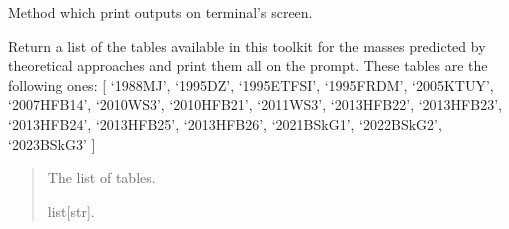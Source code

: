 \documentclass[letterpaper,10pt,english]{sphinxmanual}
\begin{document}
\begin{fulllineitems}
\begin{fulllineitems}
\end{fulllineitems}


\begin{fulllineitems}
\label{\detokenize{source/api/setup_nuc_be_theo:nucleardatapy.setup_nuc_be_theo.SetupNucBETheo.print_outputs}}
\pysigstartsignatures
\pysiglinewithargsret
{}
{}
{}
\pysigstopsignatures
\sphinxAtStartPar
Method which print outputs on terminal’s screen.

\end{fulllineitems}


\end{fulllineitems}


\begin{fulllineitems}
\label{\detokenize{source/api/setup_nuc_be_theo:nucleardatapy.setup_nuc_be_theo.nuc_be_theo_tables}}
\pysigstartsignatures
\pysiglinewithargsret
{}
{}
{}
\pysigstopsignatures
\sphinxAtStartPar
Return a list of the tables available in this toolkit for the masses
predicted by theoretical approaches and print them all on the prompt.
These tables are the following ones:     {[} ‘1988\sphinxhyphen{}MJ’, ‘1995\sphinxhyphen{}DZ’, ‘1995\sphinxhyphen{}ETFSI’, ‘1995\sphinxhyphen{}FRDM’,     ‘2005\sphinxhyphen{}KTUY’, ‘2007\sphinxhyphen{}HFB14’, ‘2010\sphinxhyphen{}WS3’, ‘2010\sphinxhyphen{}HFB21’, ‘2011\sphinxhyphen{}WS3’, ‘2013\sphinxhyphen{}HFB22’,     ‘2013\sphinxhyphen{}HFB23’, ‘2013\sphinxhyphen{}HFB24’, ‘2013\sphinxhyphen{}HFB25’, ‘2013\sphinxhyphen{}HFB26’, ‘2021\sphinxhyphen{}BSkG1’,     ‘2022\sphinxhyphen{}BSkG2’, ‘2023\sphinxhyphen{}BSkG3’ {]}
\begin{quote}\begin{description}
\sphinxAtStartPar
The list of tables.

\sphinxAtStartPar
list{[}str{]}.

\end{description}\end{quote}

\end{fulllineitems}
\end{document}

